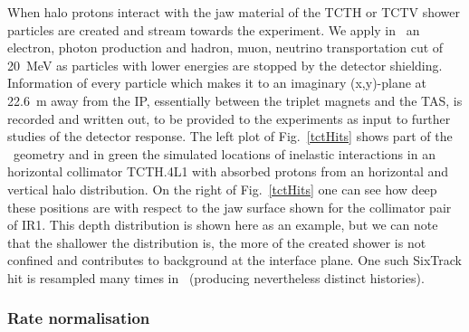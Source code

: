 When halo protons interact with the jaw material of the TCTH or TCTV shower particles are created and stream towards the experiment. We apply in \fluka\ an electron, photon production and hadron, muon, neutrino transportation cut of 20~MeV as particles with lower energies are stopped by the detector shielding. Information of every particle which makes it to an imaginary (x,y)-plane at 22.6~m away from the IP, essentially between the triplet magnets and the TAS, is recorded and written out, to be provided to the experiments as input to further studies of the detector response. The left plot of Fig.~\ref{tctHits} shows part of the \fluka~geometry and in green the simulated locations of inelastic interactions in an horizontal collimator TCTH.4L1 with absorbed protons from an horizontal and vertical halo distribution. On the right of Fig.~\ref{tctHits} one can see how deep these positions are with respect to the jaw surface shown for the collimator pair of IR1. This depth distribution is shown here as an example, but we can note that the shallower the distribution is, the more of the created shower is not confined and contributes to background at the interface plane. One such SixTrack hit is resampled many times in \fluka\ (producing nevertheless distinct histories).

\subsubsection{Rate normalisation}



